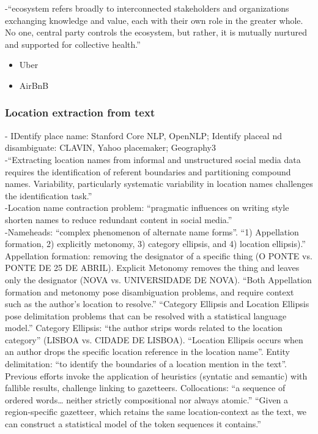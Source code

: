 -{\color{orange}“ecosystem refers broadly to interconnected stakeholders and organizations exchanging knowledge and value, each with their own role in the greater whole. No one, central party controls the ecosystem, but rather, it is mutually nurtured and supported for collective health.”\cite{WEF2021}}\\
\begin{itemize}
	\item Uber
	\item AirBnB
\end{itemize}

\subsubsection{Location extraction from text}
-{\color{orange} IDentify place name: Stanford Core NLP, OpenNLP; Identify placeal nd disambiguate: CLAVIN, Yahoo placemaker; Geography3 \cite{James2020}}\\
-{\color{orange}“Extracting location names from informal and unstructured social media data requires the identification of referent boundaries and partitioning compound names. Variability, particularly systematic variability in location names challenges the identification task.”\cite{Al-Olimat2018}}\\
-{\color{orange}Location name contraction problem: “pragmatic influences on writing style shorten names to reduce redundant content in social media.”\cite{Al-Olimat2018}}\\
-{\color{orange}Nameheads: “complex phenomenon of alternate name forms”.  “1) Appellation formation, 2) explicitly metonomy, 3) category ellipsis, and 4) location ellipsis).” Appellation formation: removing the designator of a specific thing (O PONTE vs. PONTE DE 25 DE ABRIL). Explicit Metonomy removes the thing and leaves only the designator (NOVA vs. UNIVERSIDADE DE NOVA). “Both Appellation formation and metonomy pose disambiguation problems, and require context such as the author’s location to resolve.” “Category Ellipsis and Location Ellipsis pose delimitation problems that can be resolved with a statistical language model.” Category Ellipsis: “the author strips words related to the location category” (LISBOA vs. CIDADE DE LISBOA). “Location Ellipsis occurs when an author drops the specific location reference in the location name”. Entity delimitation: “to identify the boundaries of a location mention in the text”. Previous efforts invoke the application of heuristics (syntatic and semantic) with fallible results, challenge linking to gazetteers. Collocations: “a sequence of ordered words… neither strictly compositional nor always atomic.” “Given a region-specific gazetteer, which retains the same location-context as the text, we can construct a statistical model of the token sequences it contains.”
\cite{Al-Olimat2018}}\\
